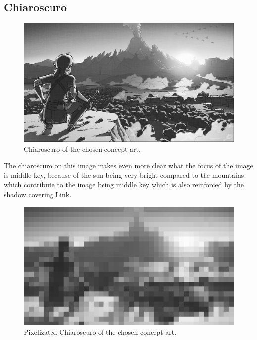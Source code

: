 \documentclass{cup-pan}
\begin{document}
        \subsection{Chiaroscuro}
            \begin{figure}[H]
                \includegraphics[width=\textwidth]{Imagenes/Referencias/Analisis_ConceptArt/claroscuro.png}
                \caption{Chiaroscuro of the chosen concept art.}
            \end{figure}

            The chiaroscuro on this image makes even more clear what the focus of the image is middle key, because of the sun being very bright compared to the mountains which contribute to the image being middle key which is also reinforced by the shadow covering Link.\\
            \begin{figure}[H]
                \includegraphics[width=\textwidth]{Imagenes/Referencias/Analisis_ConceptArt/pixel.png}
                \caption{Pixelizated Chiaroscuro of the chosen concept art.}
            \end{figure}
\end{document}
